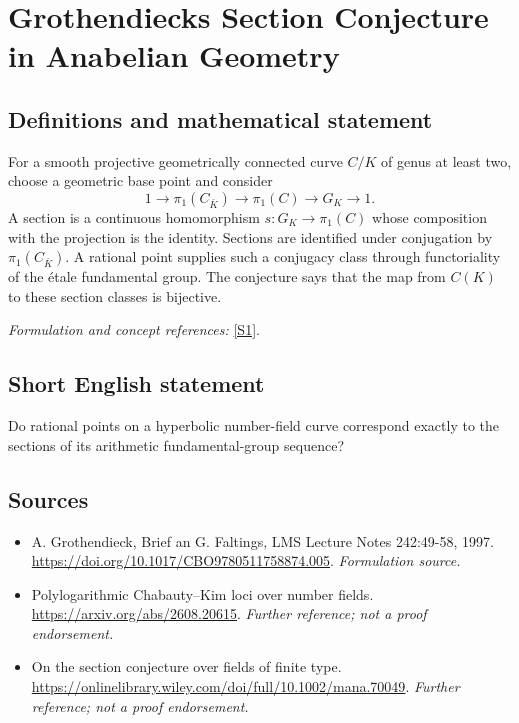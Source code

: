 \documentclass[11pt]{article}
\begin{document}
\section*{\texorpdfstring{Grothendiecks Section Conjecture in Anabelian Geometry}{Grothendiecks Section Conjecture in Anabelian Geometry}}\label{100}
\subsection{Definitions and mathematical statement}
For a smooth projective geometrically connected curve $C/K$ of genus at least two, choose a geometric base point and consider
\[
 1\longrightarrow\pi_1(C_{\bar K})\longrightarrow\pi_1(C)
 \longrightarrow G_K\longrightarrow1.
\]
A section is a continuous homomorphism $s:G_K\to\pi_1(C)$ whose composition with the projection is the identity. Sections are identified under conjugation by $\pi_1(C_{\bar K})$. A rational point supplies such a conjugacy class through functoriality of the étale fundamental group. The conjecture says that the map from $C(K)$ to these section classes is bijective.
\par\smallskip\textit{Formulation and concept references:} \href{https://doi.org/10.1017/CBO9780511758874.005}{[S1]}.

\subsection{Short English statement}
Do rational points on a hyperbolic number-field curve correspond exactly to the sections of its arithmetic fundamental-group sequence?
\subsection{Sources}
\begin{itemize}
\item[S1]A. Grothendieck, Brief an G. Faltings, LMS Lecture Notes 242:49-58, 1997.
\url{https://doi.org/10.1017/CBO9780511758874.005}.
\textit{Formulation source.}
\item[S2]Polylogarithmic Chabauty--Kim loci over number fields.
\url{https://arxiv.org/abs/2608.20615}.
\textit{Further reference; not a proof endorsement.}
\item[S3]On the section conjecture over fields of finite type.
\url{https://onlinelibrary.wiley.com/doi/full/10.1002/mana.70049}.
\textit{Further reference; not a proof endorsement.}
\end{itemize}
\end{document}
